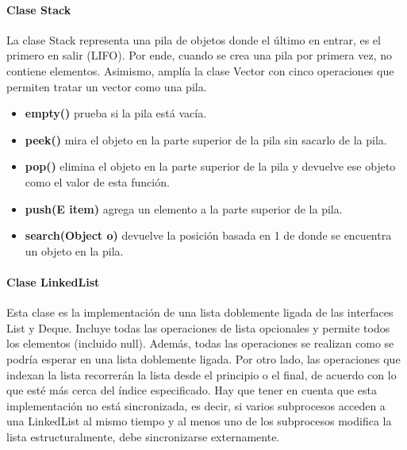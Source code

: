 \documentclass{report}
\begin{document}
\paragraph{Clase Stack}
La clase Stack representa una pila de objetos donde el último en entrar, es el primero en salir (LIFO). Por ende, cuando se crea una pila por primera vez, no contiene elementos. Asimismo, amplía la clase Vector con cinco operaciones que permiten tratar un vector como una pila. 
\begin{itemize}
    \item \textbf{empty()} prueba si la pila está vacía.
    \item \textbf{peek() }mira el objeto en la parte superior de la pila sin sacarlo de la pila.
    \item \textbf{pop()} elimina el objeto en la parte superior de la pila y devuelve ese objeto como el valor de esta función.
    \item \textbf{push(E item)} agrega un elemento a la parte superior de la pila.
    \item \textbf{search(Object o)} devuelve la posición basada en 1 de donde se encuentra un objeto en la pila.
\end{itemize}
\paragraph{Clase LinkedList}
Esta clase es la implementación de una lista doblemente ligada de las interfaces List y Deque. Incluye todas las operaciones de lista opcionales y permite todos los elementos (incluido null). Además, todas las operaciones se realizan como se podría esperar en una lista doblemente ligada. Por otro lado, las operaciones que indexan la lista recorrerán la lista desde el principio o el final, de acuerdo con lo que esté más cerca del índice especificado. Hay que tener en cuenta que esta implementación no está sincronizada, es decir, si varios subprocesos acceden a una LinkedList al mismo tiempo y al menos uno de los subprocesos modifica la lista estructuralmente, debe sincronizarse externamente.
\end{document}

